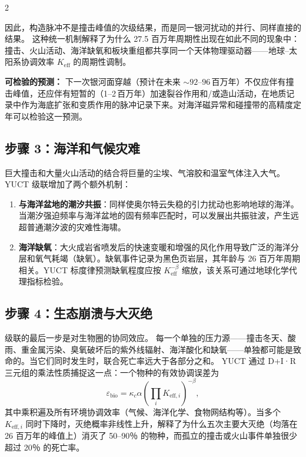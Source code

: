 \documentclass[11pt,a4paper]{article}
\begin{document}
	\begin{multicols}{2}
		
		因此，构造脉冲不是撞击峰值的次级结果，而是同一银河扰动的并行、同样直接的结果。
		这种统一机制解释了为什么 27.5 百万年周期性出现在如此不同的现象中：撞击、火山活动、海洋缺氧和板块重组都共享同一个天体物理驱动器——地球–太阳系协调效率 \(K_{\mathrm{eff}}\) 的周期性调制。
		
		\vspace{0.2cm}
		\noindent
		\textbf{可检验的预测：} 下一次银河面穿越（预计在未来 \(\sim 92\)–\(96\) 百万年）不仅应伴有撞击峰值，还应伴有短暂的（1–2 百万年）加速裂谷作用和/或造山活动，在地质记录中作为海底扩张和变质作用的脉冲记录下来。对海洋磁异常和碰撞带的高精度定年可以检验这一预测。
		
		\subsection{步骤 3：海洋和气候灾难}
		
		巨大撞击和大量火山活动的结合将巨量的尘埃、气溶胶和温室气体注入大气。
		YUCT 级联增加了两个额外机制：
		\begin{enumerate}
			\item \textbf{与海洋盆地的潮汐共振}：同样使奥尔特云失稳的引力扰动也影响地球的海洋。当潮汐强迫频率与海洋盆地的固有频率匹配时，可以发展出共振驻波，产生远超普通潮汐波的灾难性海啸。
			\item \textbf{海洋缺氧}：大火成岩省喷发后的快速变暖和增强的风化作用导致广泛的海洋分层和氧气耗竭（缺氧）。缺氧事件记录为黑色页岩层，其年龄与 26 百万年周期相关。YUCT 标度律预测缺氧程度应按 \(K_{\mathrm{eff}}^{-\beta}\) 缩放，该关系可通过地球化学代理指标检验。
		\end{enumerate}
		
		\subsection{步骤 4：生态崩溃与大灭绝}
		
		级联的最后一步是对生物圈的协同效应。
		每一个单独的压力源——撞击冬天、酸雨、重金属污染、臭氧破坏后的紫外线辐射、海洋酸化和缺氧——单独都可能是致命的。当它们同时发生时，联合死亡率远大于各部分之和。
		YUCT 通过 D+I·R 三元组的乘法性质捕捉这一点：一个物种的有效协调误差为
		\[
		\varepsilon_{\text{bio}} = \kappa_c \alpha \left( \prod_{i} K_{\mathrm{eff},i} \right)^{-\beta},
		\]
		其中乘积遍及所有环境协调效率（气候、海洋化学、食物网结构等）。当多个 \(K_{\mathrm{eff},i}\) 同时下降时，灭绝概率非线性上升，解释了为什么五次主要大灭绝（均落在 26 百万年的峰值上）消灭了 50–90％ 的物种，而孤立的撞击或火山事件单独很少超过 20％ 的死亡率。
		
	\end{multicols}
	
\end{document}
